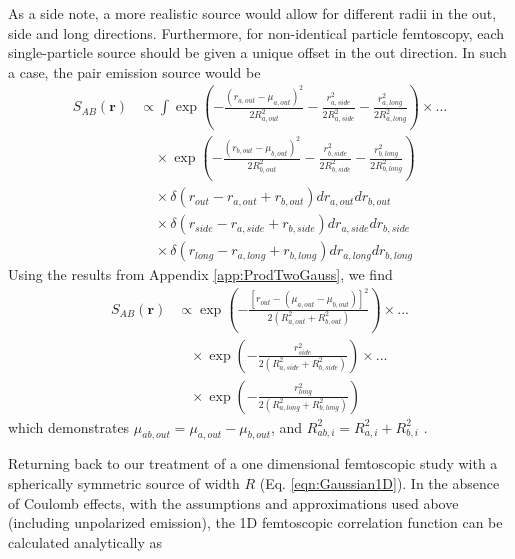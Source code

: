 \documentclass[/home/jesse/Analysis/FemtoAnalysis/AnalysisNotes/AnalysisNoteJBuxton.tex]{subfiles}
\begin{document}
As a side note, a more realistic source would allow for different radii in the out, side and long directions.
Furthermore, for non-identical particle femtoscopy, each single-particle source should be given a unique offset in the out direction.
In such a case, the pair emission source would be
\begin{equation}
\begin{aligned}
S_{AB}(\mathbf{r}) &\propto \int \exp\left(-\frac{(r_{a, out}-\mu_{a, out})^{2}}{2R^{2}_{a, out}} - \frac{r^{2}_{a, side}}{2R^{2}_{a, side}} - \frac{r^{2}_{a, long}}{2R^{2}_{a, long}} \right) \times ... \\
&~~~~~\times \exp\left(-\frac{(r_{b, out}-\mu_{b, out})^{2}}{2R^{2}_{b, out}} - \frac{r^{2}_{b, side}}{2R^{2}_{b, side}} - \frac{r^{2}_{b, long}}{2R^{2}_{b, long}} \right) \\
&~~~~~\times \delta(r_{out}-r_{a,out}+r_{b,out})dr_{a,out}dr_{b,out} \\
&~~~~~\times \delta(r_{side}-r_{a,side}+r_{b,side})dr_{a,side}dr_{b,side} \\
&~~~~~\times \delta(r_{long}-r_{a,long}+r_{b,long})dr_{a,long}dr_{b,long}
\end{aligned}
\label{eqn:SingleGaussSourceWithShift}
\end{equation}
Using the results from Appendix \ref{app:ProdTwoGauss}, we find
\begin{equation}
\begin{aligned}
S_{AB}(\mathbf{r}) &\propto \exp\left(-\frac{[r_{out}-(\mu_{a, out}-\mu_{b, out})]^{2}}{2(R_{a,out}^{2}+R_{b,out}^{2})}\right) \times ... \\
&~~~~\times \exp\left(-\frac{r_{side}^{2}}{2(R_{a,side}^{2}+R_{b,side}^{2})}\right) \times ... \\
&~~~~\times \exp\left(-\frac{r_{long}^{2}}{2(R_{a,long}^{2}+R_{b,long}^{2})}\right)
\end{aligned}
\label{eqn:PairGaussSourceWithShift}
\end{equation}
which demonstrates $\mu_{ab, out} = \mu_{a, out}-\mu_{b, out}$, and $R_{ab, i}^{2} = R_{a, i}^{2} + R_{b, i}^{2}$ \cite{Kisiel:2009eh}.

Returning back to our treatment of a one dimensional femtoscopic study with a spherically symmetric source of width $R$ (Eq. \ref{eqn:Gaussian1D}).
In the absence of Coulomb effects, with the assumptions and approximations used above (including unpolarized emission), the 1D femtoscopic correlation function can be calculated analytically as
\end{document}
